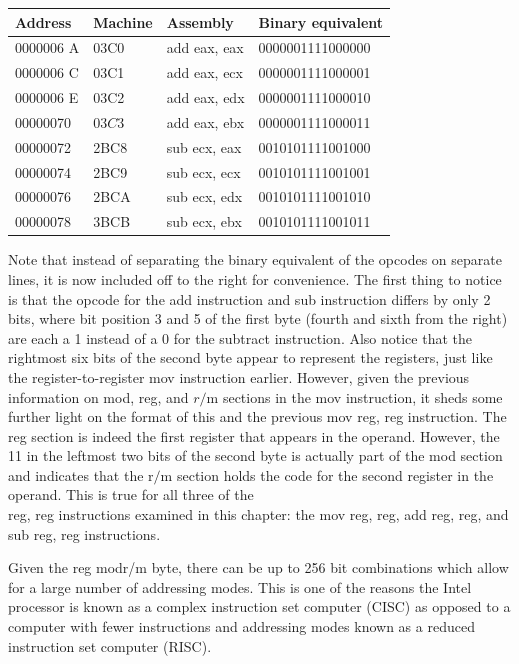 \documentclass[10pt]{book}
\begin{document}
\begin{center}
\begin{center}
\begin{center}
\begin{center}
\begin{center}
\begin{center}
\begin{tabular}{|l|l|l|l|}
\hline
Address & Machine & Assembly & Binary equivalent \\
\hline
0000006 A & 03C0 & add eax, eax & 0000001111000000 \\
\hline
0000006 C & 03C1 & add eax, ecx & 0000001111000001 \\
\hline
0000006 E & 03C2 & add eax, edx & 0000001111000010 \\
\hline
00000070 & $03 C 3$ & add eax, ebx & 0000001111000011 \\
\hline
00000072 & 2BC8 & sub ecx, eax & 0010101111001000 \\
\hline
00000074 & 2BC9 & sub ecx, ecx & 0010101111001001 \\
\hline
00000076 & 2BCA & sub ecx, edx & 0010101111001010 \\
\hline
00000078 & 3BCB & sub ecx, ebx & 0010101111001011 \\
\hline
\end{tabular}
\end{center}

Note that instead of separating the binary equivalent of the opcodes on separate lines, it is now included off to the right for convenience. The first thing to notice is that the opcode for the add instruction and sub instruction differs by only 2 bits, where bit position 3 and 5 of the first byte (fourth and sixth from the right) are each a 1 instead of a 0 for the subtract instruction. Also notice that the rightmost six bits of the second byte appear to represent the registers, just like the register-to-register mov instruction earlier. However, given the previous information on mod, reg, and $r / \mathrm{m}$ sections in the mov instruction, it sheds some further light on the format of this and the previous mov reg, reg instruction. The reg section is indeed the first register that appears in the operand. However, the 11 in the leftmost two bits of the second byte is actually part of the mod section and indicates that the $\mathrm{r} / \mathrm{m}$ section holds the code for the second register in the operand. This is true for all three of the\\
reg, reg instructions examined in this chapter: the mov reg, reg, add reg, reg, and sub reg, reg instructions.


Given the reg modr/m byte, there can be up to 256 bit combinations which allow for a large number of addressing modes. This is one of the reasons the Intel processor is known as a complex instruction set computer (CISC) as opposed to a computer with fewer instructions and addressing modes known as a reduced instruction set computer (RISC).


\end{center}
\end{center}
\end{center}
\end{center}
\end{center}
\end{document}
